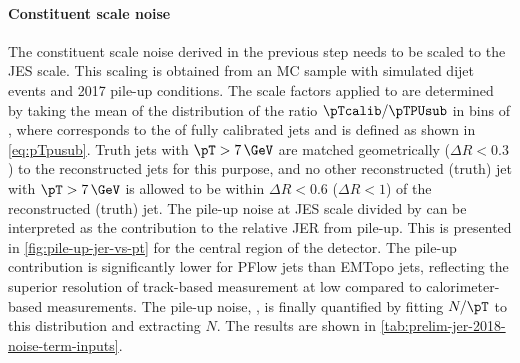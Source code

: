 \paragraph{Constituent scale noise} The constituent scale noise derived in the previous step needs to be scaled to the JES scale.
This scaling is obtained from an MC sample with simulated dijet events and 2017 pile-up conditions. The scale factors applied to \Npileupconstscale are determined by taking the mean of the distribution of the ratio $\pTcalib / \pTPUsub$ in bins of \pTtruth, where \pTcalib corresponds to the \pT of fully calibrated jets and \pTPUsub is defined as shown in \cref{eq:pTpusub}. Truth jets with $\pT > 7\,\GeV$ are matched geometrically ($\Delta R < 0.3$) to the reconstructed jets for this purpose, and no other reconstructed (truth) jet with $\pT > 7\,\GeV$ is allowed to be within $\Delta R < 0.6$ ($\Delta R < 1$) of the reconstructed (truth) jet.
The pile-up noise at JES scale divided by \pTtruth can be interpreted as the contribution to the relative JER from pile-up. This is presented in \cref{fig:pile-up-jer-vs-pt} for the central region of the detector.
The pile-up contribution is significantly lower for PFlow jets than EMTopo jets, reflecting the superior resolution of track-based measurement at low \pT compared to calorimeter-based measurements.
The pile-up noise, \Npileup, is finally quantified by fitting $N/\pT$ to this distribution and extracting $N$. The results are shown in \cref{tab:prelim-jer-2018-noise-term-inputs}.





